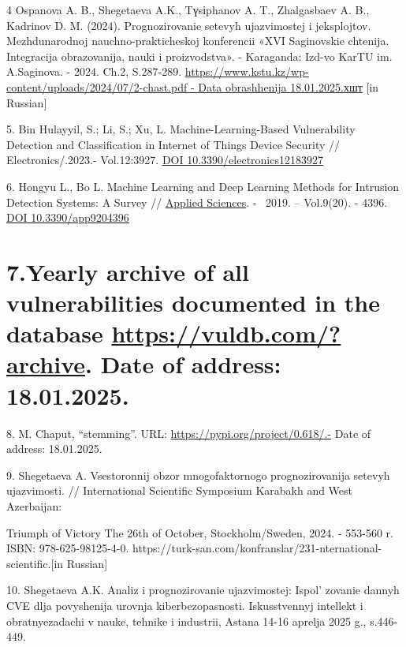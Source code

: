 4 Ospanova A. B., Shegetaeva A.K., Tүsіphanov A. T., Zhalgasbaev A. B.,
Kadrinov D. M. (2024). Prognozirovanie setevyh ujazvimostej i
jeksplojtov. Mezhdunarodnoj nauchno-prakticheskoj konferencii «XVI
Saginovskie chtenija. Integracija obrazovanija, nauki i proizvodstva». -
Karaganda: Izd-vo KarTU im. A.Saginova. - 2024. Ch.2, S.287-289.
\href{https://www.kstu.kz/wp-content/uploads/2024/07/2-chast.pdf\%20-\%20Data\%20obrashhenija\%2018.01.2025.хшт}{https://www.kstu.kz/wp-content/uploads/2024/07/2-chast.pdf
- Data obrashhenija 18.01.2025.хшт} {[}in Russian{]}

5. Bin Hulayyil, S.; Li, S.; Xu, L. Machine-Learning-Based Vulnerability
Detection and Classification in Internet of Things Device Security //
Electronics/.2023.- Vol.12:3927.
\href{https://doi.org/10.3390/electronics12183927}{DOI
10.3390/electronics12183927}

6. Hongyu L., Bo L. Machine Learning and Deep Learning Methods for
Intrusion Detection Systems: A Survey //
\href{https://www.mdpi.com/journal/applsci}{Applied Sciences}. - ~2019.
-- Vol.9(20). - 4396. \href{https://doi.org/10.3390/app9204396}{DOI
10.3390/app9204396}

\section{\texorpdfstring{7.Yearly archive of all vulnerabilities
documented in the database \url{https://vuldb.com/?archive}. Date of
address:
18.01.2025. }{7.Yearly archive of all vulnerabilities documented in the database https://vuldb.com/?archive. Date of address: 18.01.2025.}}\label{yearly-archive-of-all-vulnerabilities-documented-in-the-database-httpsvuldb.comarchive.-date-of-address-18.01.2025.}

8. M. Chaput, ``stemming''. URL: \url{https://pypi.org/project/0.618/.-}
Date of address: 18.01.2025.

9. Shegetaeva A. Vsestoronnij obzor mnogofaktornogo prognozirovanija
setevyh ujazvimosti. // International Scientific Symposium Karabakh and
West Azerbaijan:

Triumph of Victory The 26th of October, Stockholm/Sweden, 2024. -
553-560 r. ISBN: 978-625-98125-4-0.
https://turk-san.com/konfranslar/231-nternational-scientific\href{https://turk-san.com/konfranslar/231-nternational-scientific-symposium-karabakh-and-west-azerbaijan-triumph-of-victory-the-26th-of-october-2024-stockholm-sweden.html}{}.{[}in
Russian{]}

10. Shegetaeva A.K. Analiz i prognozirovanie ujazvimostej:
Ispol' zovanie dannyh CVE dlja povyshenija urovnja
kiberbezopasnosti. Iskusstvennyj intellekt i obratnyezadachi v nauke,
tehnike i industrii, Astana 14-16 aprelja 2025 g., s.446-449.

